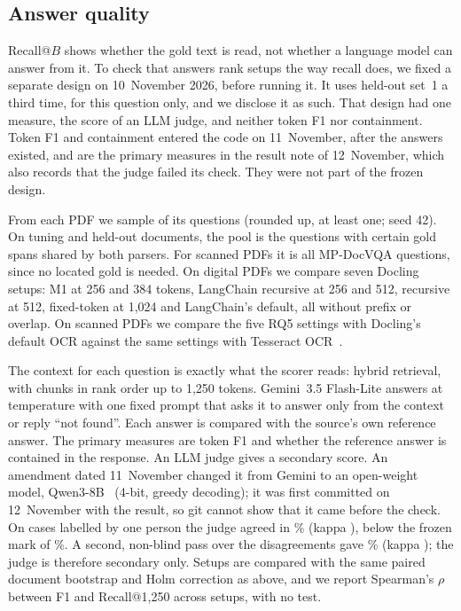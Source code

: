 \subsection{Answer quality}\label{sec:aq}

Recall@$B$ shows whether the gold text is read, not whether a language model
can answer from it. To check that answers rank setups the way recall does, we
fixed a separate design on 10~November 2026, before running it. It uses
held-out set~1 a third time, for this question only, and we disclose it as
such. That design had one measure, the score of an LLM judge, and neither token
F1 nor containment. Token F1 and containment entered the code on 11~November,
after the answers existed, and are the primary measures in the result note of 12~November, which
also records that the judge failed its check. They were not part of the frozen design.

From each PDF we sample \AQSampleShare{} of its questions (rounded up, at least one;
seed 42). On tuning and held-out documents, the pool is the questions with
certain gold spans shared by both parsers. For scanned PDFs it is all \ScannedQuestions{}
MP-DocVQA questions, since no located gold is needed. On digital PDFs we
compare seven Docling setups: M1 at 256 and 384 tokens, LangChain recursive at
256 and 512, recursive at 512, fixed-token at 1,024 and LangChain's default,
all without prefix or overlap. On scanned PDFs we compare the five RQ5
settings with Docling's default OCR against the same settings with Tesseract
OCR~\cite{tesseract}.

The context for each question is exactly what the scorer reads: hybrid
retrieval, with chunks in rank order up to 1,250 tokens. Gemini~3.5 Flash-Lite
answers at temperature \AnswerTemperature{} with one fixed prompt that asks it to answer only
from the context or reply ``not found''. Each answer is compared with the
source's own reference answer. The primary measures are token F1 and whether
the reference answer is contained in the response. An LLM judge gives a
secondary score. An amendment dated 11~November changed it from Gemini to an
open-weight model, Qwen3-8B~\cite{qwen3} (4-bit, greedy decoding); it was first committed on
12~November with the result, so git cannot show that it came before the check.
On \JudgeCases{} cases labelled by one person the judge agreed in
\ManualJudgeFirstPassAgreement\% (kappa \ManualJudgeFirstPassKappa{}), below the
frozen mark of \JudgePassMark\%. A second, non-blind pass over the disagreements gave
\JudgeSecondAgreement\% (kappa \JudgeSecondKappa{}); the judge is therefore
secondary only. Setups are compared with
the same paired document bootstrap and Holm correction as above, and we report
Spearman's $\rho$ between F1 and Recall@1,250 across setups, with no test.